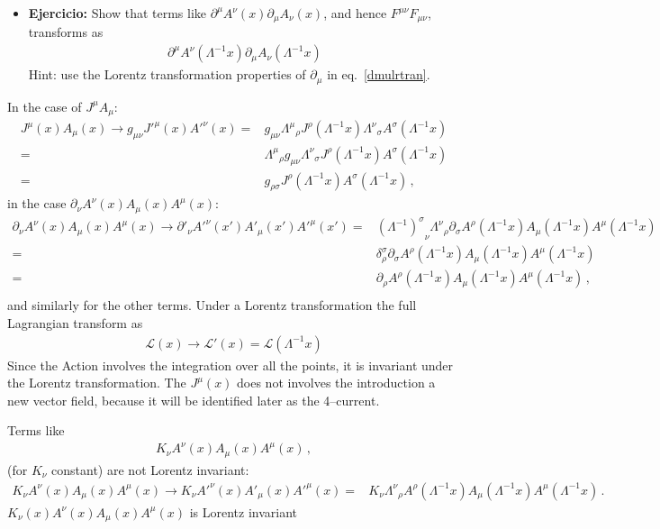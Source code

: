 \begin{itemize}
\item \textbf{Ejercicio:} Show that terms like $\partial^\mu A^\nu(x)\partial_\mu A_\nu(x)$, and hence $F^{\mu\nu}F_{\mu\nu}$, transforms as
  \begin{align}
    \partial^\mu A^\nu\left(\Lambda^{-1}x\right)\partial_\mu A_\nu\left(\Lambda^{-1}x\right)
  \end{align}
Hint: use the Lorentz transformation properties of $\partial_\mu$ in eq.~\eqref{dmulrtran}.
\end{itemize}
In the case of $J^\mu A_\mu$:
\begin{align}
  J^\mu(x)A_\mu(x)\to g_{\mu\nu}{J'}^\mu(x){A'}^\nu(x)=& g_{\mu\nu}{\Lambda^\mu}_\rho J^\rho\left(\Lambda^{-1}x\right){\Lambda^\nu}_\sigma A^\sigma\left(\Lambda^{-1}x\right)\nonumber\\
=& {\Lambda^\mu}_\rho g_{\mu\nu}{\Lambda^\nu}_\sigma J^\rho\left(\Lambda^{-1}x\right)A^\sigma\left(\Lambda^{-1}x\right)\nonumber\\
=& g_{\rho\sigma}J^\rho\left(\Lambda^{-1}x\right)A^\sigma\left(\Lambda^{-1}x\right)\,,
\end{align}
in the case $\partial_\nu A^\nu(x) A_\mu(x) A^\mu(x)$:
\begin{align}
   \partial_\nu A^\nu(x) A_\mu(x) A^\mu(x)\to {\partial'}_\nu{A'}^\nu(x') {A'}_\mu(x') {A'}^\mu(x')=& {\left(\Lambda^{-1}\right)^\sigma}_\nu{\Lambda^\nu}_\rho\partial_\sigma A^\rho\left(\Lambda^{-1}x\right) A_\mu\left(\Lambda^{-1}x\right) A^\mu\left(\Lambda^{-1}x\right)\nonumber\\
=& \delta^\sigma_\rho\partial_\sigma A^\rho\left(\Lambda^{-1}x\right) A_\mu\left(\Lambda^{-1}x\right) A^\mu\left(\Lambda^{-1}x\right)\nonumber\\
=& \partial_\rho A^\rho\left(\Lambda^{-1}x\right) A_\mu\left(\Lambda^{-1}x\right) A^\mu\left(\Lambda^{-1}x\right)\,,\nonumber\\
\end{align}
and similarly for the other terms. Under a Lorentz transformation the full Lagrangian transform as
\begin{align}
  \mathcal{L}(x)\to\mathcal{L}'(x)=\mathcal{L}(\Lambda^{-1}x) 
\end{align}
Since the Action involves the integration over all the points, it is invariant under the Lorentz transformation. The $J^\mu(x)$ does not involves the introduction a new vector field, because it will be identified later as the 4--current.


Terms like
\begin{align}
  K_\nu A^\nu(x) A_\mu(x) A^\mu(x)\,,
\end{align}
(for $K_\nu$ constant) are not Lorentz invariant:
\begin{align}
  K_\nu A^\nu(x) A_\mu(x) A^\mu(x)\to K_\nu{A'}^\nu(x) {A'}_\mu(x) {A'}^\mu(x)=& K_\nu{\Lambda^\nu}_\rho A^\rho\left(\Lambda^{-1}x\right) A_\mu\left(\Lambda^{-1}x\right) A^\mu\left(\Lambda^{-1}x\right)\,.
\end{align}
$K_\nu(x)A^\nu(x)A_\mu(x)A^\mu(x)$ is Lorentz invariant %




